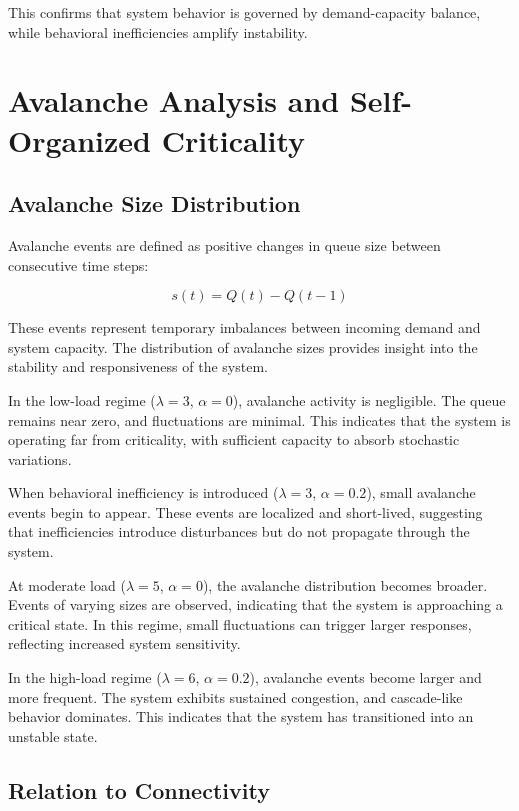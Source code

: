 \documentclass[11pt]{article}
\begin{document}
This confirms that system behavior is governed by demand-capacity balance, while behavioral inefficiencies amplify instability.
\section{Avalanche Analysis and Self-Organized Criticality}

\subsection{Avalanche Size Distribution}

Avalanche events are defined as positive changes in queue size between consecutive time steps:

\begin{equation}
s(t) = Q(t) - Q(t-1)
\end{equation}

These events represent temporary imbalances between incoming demand and system capacity. The distribution of avalanche sizes provides insight into the stability and responsiveness of the system.

In the low-load regime ($\lambda = 3$, $\alpha = 0$), avalanche activity is negligible. The queue remains near zero, and fluctuations are minimal. This indicates that the system is operating far from criticality, with sufficient capacity to absorb stochastic variations.

When behavioral inefficiency is introduced ($\lambda = 3$, $\alpha = 0.2$), small avalanche events begin to appear. These events are localized and short-lived, suggesting that inefficiencies introduce disturbances but do not propagate through the system.

At moderate load ($\lambda = 5$, $\alpha = 0$), the avalanche distribution becomes broader. Events of varying sizes are observed, indicating that the system is approaching a critical state. In this regime, small fluctuations can trigger larger responses, reflecting increased system sensitivity.

In the high-load regime ($\lambda = 6$, $\alpha = 0.2$), avalanche events become larger and more frequent. The system exhibits sustained congestion, and cascade-like behavior dominates. This indicates that the system has transitioned into an unstable state.

\subsection{Relation to Connectivity}
\end{document}

